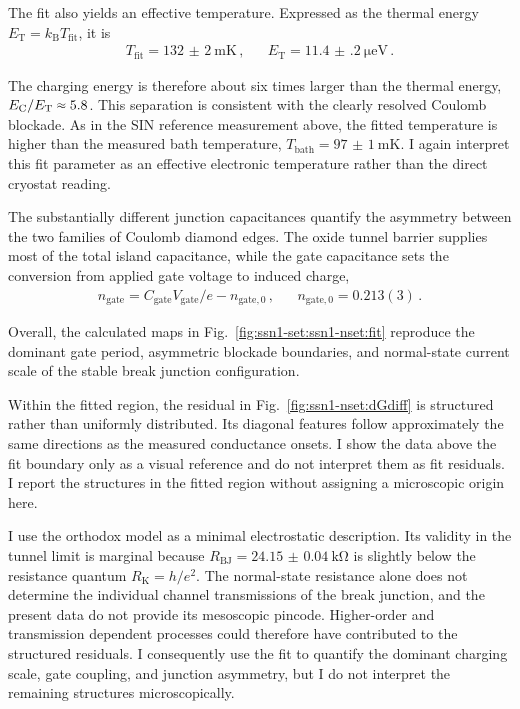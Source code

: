            The fit also yields an effective temperature. Expressed as the thermal energy $E_\mathrm{T}=k_\mathrm{B}T_\mathrm{fit}$, it is
            \begin{align}
                T_\mathrm{fit} = \qty{132(2)}{\milli\kelvin}\,, &&
                E_\mathrm{T} = \qty{11.4(2)}{\micro\electronvolt}\,.
                \label{eq:ssn-set:static:nset-temperature}
            \end{align}

            The charging energy is therefore about six times larger than the thermal energy, $E_\mathrm{C}/E_\mathrm{T}\sapprox5.8$. This separation is consistent with the clearly resolved Coulomb blockade. As in the SIN reference measurement above, the fitted temperature is higher than the measured bath temperature, $T_\mathrm{bath}=\qty{97(1)}{\milli\kelvin}$. I again interpret this fit parameter as an effective electronic temperature rather than the direct cryostat reading.

            The substantially different junction capacitances quantify the asymmetry between the two families of Coulomb diamond edges. The oxide tunnel barrier supplies most of the total island capacitance, while the gate capacitance sets the conversion from applied gate voltage to induced charge,
            \begin{align}
                n_\mathrm{gate} = C_\mathrm{gate}V_\mathrm{gate}/e-n_{\mathrm{gate},0}\,, && 
                n_{\mathrm{gate},0} = 0.213(3)\,.
                \label{eq:ssn-set:static:nset-gate-charge}
            \end{align}

            Overall, the calculated maps in Fig.~\ref{fig:ssn1-set:ssn1-nset:fit} reproduce the dominant gate period, asymmetric blockade boundaries, and normal-state current scale of the stable break junction configuration.

            Within the fitted region, the residual in Fig.~\ref{fig:ssn1-nset:dGdiff} is structured rather than uniformly distributed. Its diagonal features follow approximately the same directions as the measured conductance onsets. I show the data above the fit boundary only as a visual reference and do not interpret them as fit residuals. I report the structures in the fitted region without assigning a microscopic origin here.

            I use the orthodox model as a minimal electrostatic description. Its validity in the tunnel limit is marginal because $R_\mathrm{BJ}=\qty{24.15(4)}{\kilo\ohm}$ is slightly below the resistance quantum $R_\mathrm{K}=h/e^2$. The normal-state resistance alone does not determine the individual channel transmissions of the break junction, and the present data do not provide its mesoscopic pincode. Higher-order and transmission dependent processes could therefore have contributed to the structured residuals. I consequently use the fit to quantify the dominant charging scale, gate coupling, and junction asymmetry, but I do not interpret the remaining structures microscopically.

